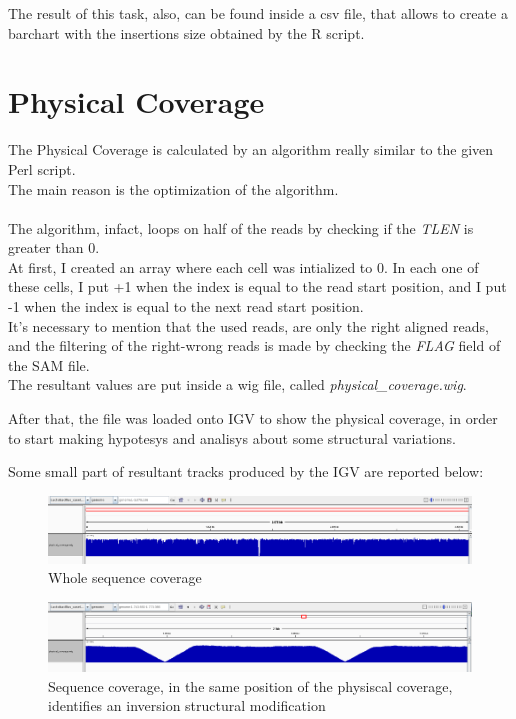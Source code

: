 The result of this task, also, can be found inside a csv file, that allows to create a barchart with the insertions size obtained by the R script.

\section{Physical Coverage}

The Physical Coverage is calculated by an algorithm really similar to the given Perl script.\\

The main reason is the optimization of the algorithm.\\\\

The algorithm, infact, loops on half of the reads by checking if the \emph{TLEN} is greater than 0.\\
At first, I created an array where each cell was intialized to 0. 
In each one of these cells, I put +1 when the index is equal to the read start position, and I put -1 when the index is equal to the next read start position.\\

It's necessary to mention that the used reads, are only the right aligned reads, and the filtering of the right-wrong reads is made by checking the \emph{FLAG} field of the SAM file.
\\
The resultant values are put inside a wig file, called \emph{physical\_coverage.wig}.

After that, the file was loaded onto IGV to show the physical coverage, in order to start making hypotesys and analisys about some structural variations.

Some small part of resultant tracks produced by the IGV are reported below:

 \begin{figure}[H]
				\centering
				\includegraphics[scale=0.6]{immagini/physical_coverage_1.png}
				\caption{Whole sequence coverage}\label{fig:6}
				\end{figure}


 \begin{figure}[H]
				\centering
				\includegraphics[scale=0.6]{immagini/physical_coverage_2.png}
				\caption{Sequence coverage, in the same position of the physiscal coverage, identifies an inversion structural modification}\label{fig:7}
				\end{figure}
				
